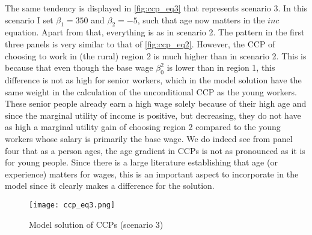 The same tendency is displayed in \autoref{fig:ccp_eq3} that represents scenario 3. In this scenario I set $\beta_1=350$ and $\beta_2=-5$, such that age now matters in the $inc$ equation. Apart from that, everything is as in scenario 2. The pattern in the first three panels is very similar to that of \autoref{fig:ccp_eq2}. However, the CCP of choosing to work in (the rural) region 2 is much higher than in scenario 2. This is because that even though the base wage $\beta_0^2$ is lower than in region 1, this difference is not as high for senior workers, which in the model solution have the same weight in the calculation of the unconditional CCP as the young workers. These senior people already earn a high wage solely because of their high age and since the marginal utility of income is positive, but decreasing, they do not have as high a marginal utility gain of choosing region 2 compared to the young workers whose salary is primarily the base wage. We do indeed see from panel four that as a person ages, the age gradient in CCPs is not as pronounced as it is for young people. Since there is a large literature  establishing that age (or experience) matters for wages, this is an important aspect to incorporate in the model since it clearly makes a difference for the solution. 
\begin{figure}
\centering
\texttt{[image: ccp\_eq3.png]} 
\caption{Model solution of CCPs (scenario 3)}
\label{fig:ccp_eq3}
\end{figure}

